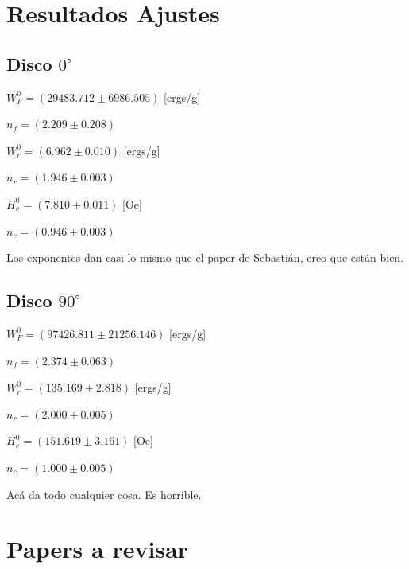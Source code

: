 \documentclass[aps,prd,a4paper,10pt, twocolumn,amsmath,showpacs,superscriptaddress,nofootinbib,preprintnumbers,notitlepage]{revtex4-2}
\begin{document}
\section{Resultados Ajustes}
\subsection{Disco $0^\circ$}

$W^0_F = (29483.712\pm6986.505)$ [ergs/g]

$n_f=(2.209\pm0.208)$




$W^0_r = (6.962\pm0.010)$ [ergs/g]

$n_r=(1.946\pm0.003)$




$H^0_c = (7.810\pm0.011)$ [Oe]

$n_c = (0.946\pm0.003)$

Los exponentes dan casi lo mismo que el paper de Sebastián, creo que están bien.
\subsection{Disco $90^\circ$}
$W^0_F = (97426.811\pm21256.146)$ [ergs/g]

$n_f=(2.374\pm0.063)$



$W^0_r = (135.169\pm2.818)$ [ergs/g]

$n_r=(2.000\pm0.005)$

$H^0_c = (151.619\pm3.161)$ [Oe]

$n_c = (1.000\pm0.005)$

Acá da todo cualquier cosa. Es horrible.

\section{Papers a revisar}




\end{document}
